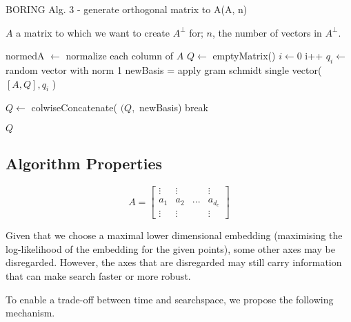 \begin{algorithm}[H]
\caption{BORING Alg. 3 - generate orthogonal matrix to A(A, n) }

\begin{algorithmic} 
\REQUIRE $A$ a matrix to which we want to create $A^{\bot}$ for; $n$, the number of vectors in $A^{\bot}$.

\STATE normedA $ \leftarrow $ normalize each column of $A$
\STATE $Q \leftarrow$ emptyMatrix()
\STATE $i \leftarrow 0$ 
\STATE i++
\STATE $q_i \leftarrow $ random vector with norm 1
\STATE newBasis = apply gram schmidt single vector( $[A, Q], q_i$ ) 

\STATE $Q \leftarrow$ colwiseConcatenate( $(Q, $ newBasis)
\STATE break
\ENDIF
\ENDWHILE                
\ENDFOR

\RETURN $Q$
\end{algorithmic}
\end{algorithm}



\subsection{Algorithm Properties}


\begin{equation}
A = 
\begin{bmatrix}
 \vdots & \vdots & & \vdots \\
 a_1 & a_2 & ... & a_{d_e} \\
 \vdots & \vdots & & \vdots
\end{bmatrix}
\label{eq:maximalEmbedding}
\end{equation}

Given that we choose a maximal lower dimensional embedding (maximising the log-likelihood of the embedding for the given points), some other axes may be disregarded.
However, the axes that are disregarded may still carry information that can make search faster or more robust.

To enable a trade-off between time and searchspace, we propose the following mechanism.


